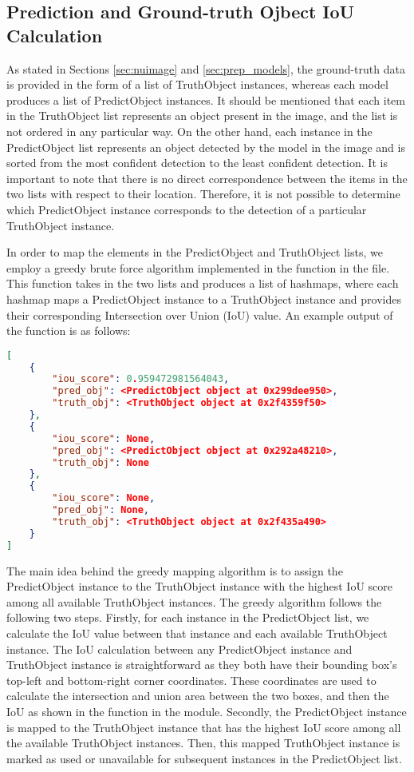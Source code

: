 \subsection{Prediction and Ground-truth Ojbect IoU Calculation}

As stated in Sections \ref{sec:nuimage} and \ref{sec:prep_models}, the ground-truth data is provided in the form of a list of TruthObject instances, whereas each model produces a list of PredictObject instances. It should be mentioned that each item in the TruthObject list represents an object present in the image, and the list is not ordered in any particular way. On the other hand, each instance in the PredictObject list represents an object detected by the model in the image and is sorted from the most confident detection to the least confident detection. It is important to note that there is no direct correspondence between the items in the two lists with respect to their location. Therefore, it is not possible to determine which PredictObject instance corresponds to the detection of a particular TruthObject instance.

In order to map the elements in the PredictObject and TruthObject lists, we employ a greedy brute force algorithm implemented in the  function in the  file. This function takes in the two lists and produces a list of hashmaps, where each hashmap maps a PredictObject instance to a TruthObject instance and provides their corresponding Intersection over Union (IoU) value. An example output of the  function is as follows:

\begin{lstlisting}[language=json,firstnumber=1]
[
    {
        "iou_score": 0.959472981564043,
        "pred_obj": <PredictObject object at 0x299dee950>,
        "truth_obj": <TruthObject object at 0x2f4359f50>
    },
    {
        "iou_score": None,
        "pred_obj": <PredictObject object at 0x292a48210>,
        "truth_obj": None
    },
    {
        "iou_score": None,
        "pred_obj": None,
        "truth_obj": <TruthObject object at 0x2f435a490>
    }
]
\end{lstlisting}

The main idea behind the greedy mapping algorithm is to assign the PredictObject instance to the TruthObject instance with the highest IoU score among all available TruthObject instances. The greedy algorithm follows the following two steps. Firstly, for each instance in the PredictObject list, we calculate the IoU value between that instance and each available TruthObject instance. The IoU calculation between any PredictObject instance and TruthObject instance is straightforward as they both have their bounding box's top-left and bottom-right corner coordinates. These coordinates are used to calculate the intersection and union area between the two boxes, and then the IoU as shown in the  function in the  module. Secondly, the PredictObject instance is mapped to the TruthObject instance that has the highest IoU score among all the available TruthObject instances. Then, this mapped TruthObject instance is marked as used or unavailable for subsequent instances in the PredictObject list.

